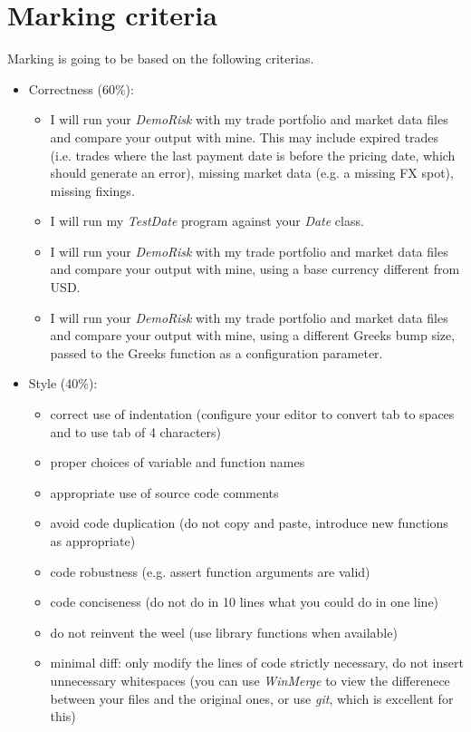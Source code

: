 \documentclass[10pt]{article}
\begin{document}
\section{Marking criteria}
Marking is going to be based on the following criterias.
\begin{itemize}
\item Correctness (60\%):
\begin{itemize}
\item I will run your \textit{DemoRisk} with my trade portfolio and market data files and compare your output with mine. This may include expired trades (i.e. trades where the last payment date is before the pricing date, which should generate an error), missing market data (e.g. a missing FX spot), missing fixings.
\item I will run my \textit{TestDate} program against your \textit{Date} class.
\item I will run your \textit{DemoRisk} with my trade portfolio and market data files and compare your output with mine, using a base currency different from USD.
\item I will run your \textit{DemoRisk} with my trade portfolio and market data files and compare your output with mine, using a different Greeks bump size, passed to the Greeks function as a configuration parameter.
\end{itemize}
\item Style (40\%):
\begin{itemize}
\item correct use of indentation (configure your editor to convert tab to spaces and to use tab of 4 characters)
\item proper choices of variable and function names
\item appropriate use of source code comments
\item avoid code duplication (do not copy and paste, introduce new functions as appropriate)
\item code robustness (e.g. assert function arguments are valid)
\item code conciseness (do not do in 10 lines what you could do in one line)
\item do not reinvent the weel (use library functions when available)
\item minimal diff: only modify the lines of code strictly necessary, do not insert unnecessary whitespaces (you can use \textit{WinMerge} to view the differenece between your files and the original ones, or use \textit{git}, which is excellent for this)
\end{itemize}
\end{itemize}
\end{document}
